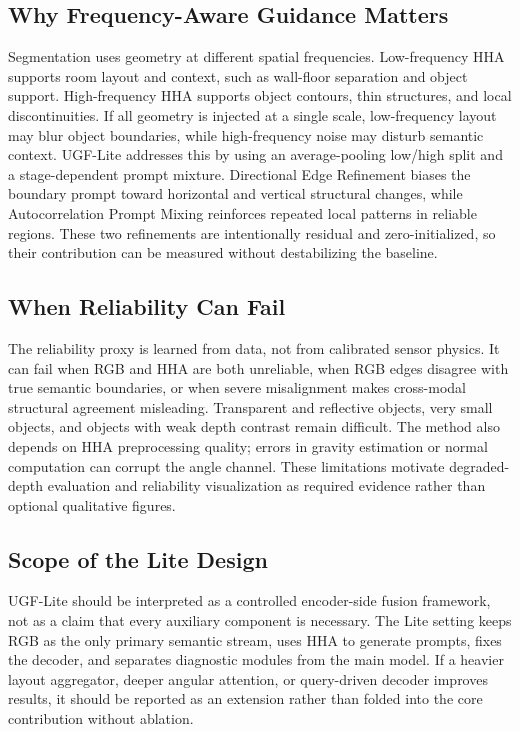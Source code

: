 \documentclass[a4paper,fleqn]{cas-dc}
\begin{document}
\subsection{Why Frequency-Aware Guidance Matters}

Segmentation uses geometry at different spatial frequencies. Low-frequency HHA supports room layout and context, such as wall-floor separation and object support. High-frequency HHA supports object contours, thin structures, and local discontinuities. If all geometry is injected at a single scale, low-frequency layout may blur object boundaries, while high-frequency noise may disturb semantic context. UGF-Lite addresses this by using an average-pooling low/high split and a stage-dependent prompt mixture. Directional Edge Refinement biases the boundary prompt toward horizontal and vertical structural changes, while Autocorrelation Prompt Mixing reinforces repeated local patterns in reliable regions. These two refinements are intentionally residual and zero-initialized, so their contribution can be measured without destabilizing the baseline.

\subsection{When Reliability Can Fail}

The reliability proxy is learned from data, not from calibrated sensor physics. It can fail when RGB and HHA are both unreliable, when RGB edges disagree with true semantic boundaries, or when severe misalignment makes cross-modal structural agreement misleading. Transparent and reflective objects, very small objects, and objects with weak depth contrast remain difficult. The method also depends on HHA preprocessing quality; errors in gravity estimation or normal computation can corrupt the angle channel. These limitations motivate degraded-depth evaluation and reliability visualization as required evidence rather than optional qualitative figures.

\subsection{Scope of the Lite Design}

UGF-Lite should be interpreted as a controlled encoder-side fusion framework, not as a claim that every auxiliary component is necessary. The Lite setting keeps RGB as the only primary semantic stream, uses HHA to generate prompts, fixes the decoder, and separates diagnostic modules from the main model. If a heavier layout aggregator, deeper angular attention, or query-driven decoder improves results, it should be reported as an extension rather than folded into the core contribution without ablation.
\end{document}
